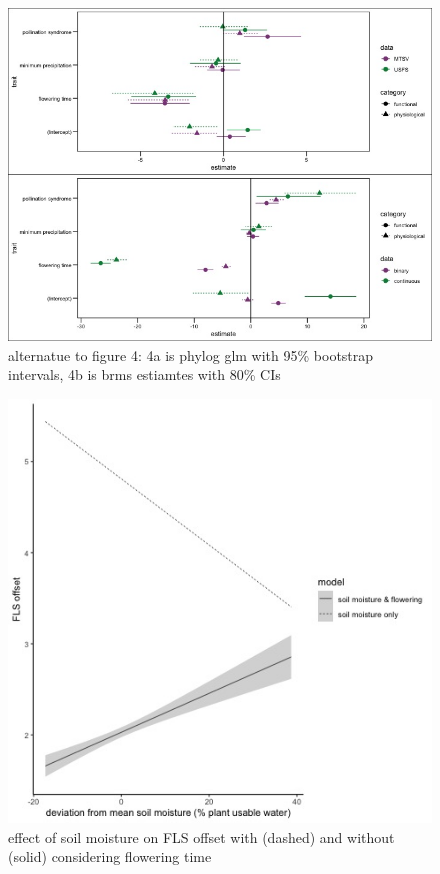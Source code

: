 \documentclass[12pt]{article}\usepackage[]{graphicx}\usepackage[]{color}
\begin{document}
        \begin{figure}
    \centering
    \includegraphics[width=\textwidth]{..//figure/cases_2pannel.jpeg}
    \caption{alternatue to figure 4: 4a is phylog glm with 95\% bootstrap intervals, 4b is brms estiamtes with 80\% CIs}
    \label{fig:Figure 5}
    \end{figure}

    
        \begin{figure}[h!]
    \centering
    \includegraphics[width=\textwidth]{..//figure/SM_comp.jpeg}
    \caption{effect of soil moisture on FLS offset with (dashed) and without (solid) considering flowering time}
    \label{fig:Figure 6}
    \end{figure}
\end{document}
